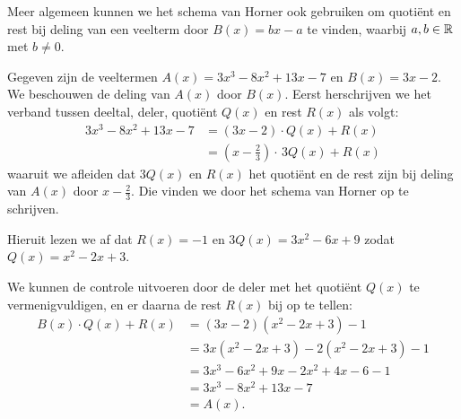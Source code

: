 \documentclass{ximera}
\begin{document}
Meer algemeen kunnen we het schema van Horner ook gebruiken om quotiënt en rest bij deling van een veelterm door \(B(x) = bx-a\) te vinden, waarbij \(a,b \in \mathbb{R}\) met \(b \neq 0\). 

\begin{example} 
Gegeven zijn de veeltermen \(A(x) = 3x^3-8x^2+13x-7\) en \(B(x) = 3x-2\). We beschouwen de deling van \(A(x)\) door \(B(x)\). Eerst herschrijven we het verband tussen deeltal, deler, quotiënt \(Q(x)\) en rest \(R(x)\) als volgt:
\begin{align*}
3x^3-8x^2+13x-7 
& = (3x-2)\cdot Q(x) + R(x) \\
& = \left(x-\frac{2}{3}\right) \cdot \,3Q(x) + R(x)
\end{align*}
waaruit we afleiden dat \(3Q(x)\) en \(R(x)\) het quotiënt en de rest zijn bij deling van \(A(x)\) door \(x - \frac{2}{3}\). Die vinden we door het schema van Horner op te schrijven.
\renewcommand{\kolbreed}{\widthof{\(-8\)}}


Hieruit lezen we af dat \(R(x) = -1\) en \(3Q(x) = 3x^2 - 6x + 9\) zodat \(Q(x) = x^2-2x+3\).

We kunnen de controle uitvoeren door de deler met het quotiënt \(Q(x)\) te vermenigvuldigen, en er daarna de rest \(R(x)\) bij op te tellen:
\begin{align*}
B(x) \cdot Q(x) + R(x) 
& = (3x-2)(x^2-2x+3) - 1 \\
& = 3x(x^2-2x+3) - 2(x^2-2x+3) - 1 \\
& = 3x^3 - 6x^2 + 9x - 2x^2 + 4x - 6 - 1 \\
& =  3x^3-8x^2+13x-7 \\
& = A(x).
\end{align*}
\end{example} 
\end{document}
